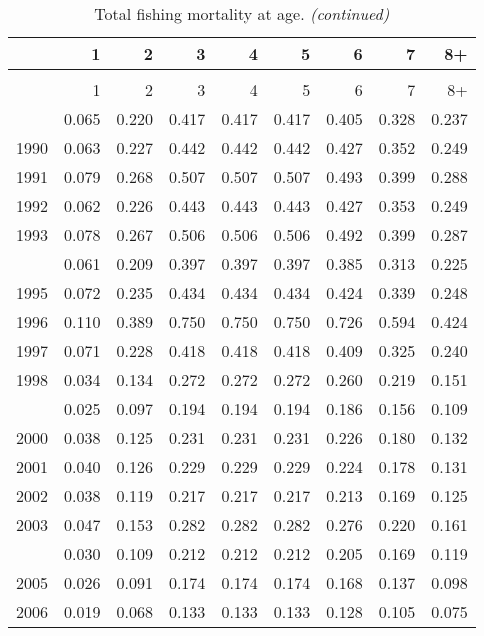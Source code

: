 \documentclass[
]{article}
\begin{document}
\begin{longtable}[t]{lrrrrrrrr}
\caption{\label{tab:FAA-tot-table}Total fishing mortality at age.}\\
\toprule
  & 1 & 2 & 3 & 4 & 5 & 6 & 7 & 8+\\
\midrule
\endfirsthead
\caption[]{Total fishing mortality at age. \textit{(continued)}}\\
\toprule
  & 1 & 2 & 3 & 4 & 5 & 6 & 7 & 8+\\
\midrule
\endhead

\endfoot
\bottomrule
\endlastfoot
1989 & 0.065 & 0.220 & 0.417 & 0.417 & 0.417 & 0.405 & 0.328 & 0.237\\
1990 & 0.063 & 0.227 & 0.442 & 0.442 & 0.442 & 0.427 & 0.352 & 0.249\\
1991 & 0.079 & 0.268 & 0.507 & 0.507 & 0.507 & 0.493 & 0.399 & 0.288\\
1992 & 0.062 & 0.226 & 0.443 & 0.443 & 0.443 & 0.427 & 0.353 & 0.249\\
1993 & 0.078 & 0.267 & 0.506 & 0.506 & 0.506 & 0.492 & 0.399 & 0.287\\
\addlinespace
1994 & 0.061 & 0.209 & 0.397 & 0.397 & 0.397 & 0.385 & 0.313 & 0.225\\
1995 & 0.072 & 0.235 & 0.434 & 0.434 & 0.434 & 0.424 & 0.339 & 0.248\\
1996 & 0.110 & 0.389 & 0.750 & 0.750 & 0.750 & 0.726 & 0.594 & 0.424\\
1997 & 0.071 & 0.228 & 0.418 & 0.418 & 0.418 & 0.409 & 0.325 & 0.240\\
1998 & 0.034 & 0.134 & 0.272 & 0.272 & 0.272 & 0.260 & 0.219 & 0.151\\
\addlinespace
1999 & 0.025 & 0.097 & 0.194 & 0.194 & 0.194 & 0.186 & 0.156 & 0.109\\
2000 & 0.038 & 0.125 & 0.231 & 0.231 & 0.231 & 0.226 & 0.180 & 0.132\\
2001 & 0.040 & 0.126 & 0.229 & 0.229 & 0.229 & 0.224 & 0.178 & 0.131\\
2002 & 0.038 & 0.119 & 0.217 & 0.217 & 0.217 & 0.213 & 0.169 & 0.125\\
2003 & 0.047 & 0.153 & 0.282 & 0.282 & 0.282 & 0.276 & 0.220 & 0.161\\
\addlinespace
2004 & 0.030 & 0.109 & 0.212 & 0.212 & 0.212 & 0.205 & 0.169 & 0.119\\
2005 & 0.026 & 0.091 & 0.174 & 0.174 & 0.174 & 0.168 & 0.137 & 0.098\\
2006 & 0.019 & 0.068 & 0.133 & 0.133 & 0.133 & 0.128 & 0.105 & 0.075\\

\end{longtable}
\end{document}

